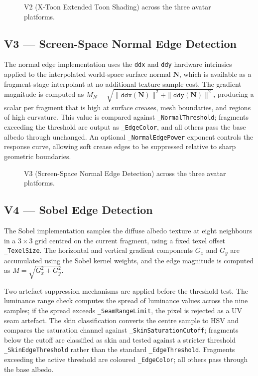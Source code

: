 \begin{figure}[H]
  \centering
  \caption{V2 (X-Toon Extended Toon Shading) across the three avatar platforms.}
  \label{fig:v2_impl}
\end{figure}

\subsection{V3 — Screen-Space Normal Edge Detection}
\label{sec:impl_v3}

The normal edge implementation uses the \texttt{ddx} and \texttt{ddy} hardware intrinsics applied to the interpolated world-space surface normal $\mathbf{N}$, which is available as a fragment-stage interpolant at no additional texture sample cost. The gradient magnitude is computed as $M_N = \sqrt{\|\texttt{ddx}(\mathbf{N})\|^2 + \|\texttt{ddy}(\mathbf{N})\|^2}$, producing a scalar per fragment that is high at surface creases, mesh boundaries, and regions of high curvature. This value is compared against \texttt{\_NormalThreshold}; fragments exceeding the threshold are output as \texttt{\_EdgeColor}, and all others pass the base albedo through unchanged. An optional \texttt{\_NormalEdgePower} exponent controls the response curve, allowing soft crease edges to be suppressed relative to sharp geometric boundaries.

\begin{figure}[H]
  \centering
  \caption{V3 (Screen-Space Normal Edge Detection) across the three avatar platforms.}
  \label{fig:v3_impl}
\end{figure}

\subsection{V4 — Sobel Edge Detection}
\label{sec:impl_v4}

The Sobel implementation samples the diffuse albedo texture at eight neighbours in a $3\times3$ grid centred on the current fragment, using a fixed texel offset \texttt{\_TexelSize}. The horizontal and vertical gradient components $G_x$ and $G_y$ are accumulated using the Sobel kernel weights, and the edge magnitude is computed as $M = \sqrt{G_x^2 + G_y^2}$.

Two artefact suppression mechanisms are applied before the threshold test. The luminance range check computes the spread of luminance values across the nine samples; if the spread exceeds \texttt{\_SeamRangeLimit}, the pixel is rejected as a UV seam artefact. The skin classification converts the centre sample to HSV and compares the saturation channel against \texttt{\_SkinSaturationCutoff}; fragments below the cutoff are classified as skin and tested against a stricter threshold \texttt{\_SkinEdgeThreshold} rather than the standard \texttt{\_EdgeThreshold}. Fragments exceeding the active threshold are coloured \texttt{\_EdgeColor}; all others pass through the base albedo.

